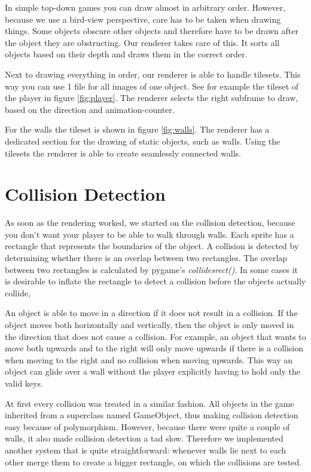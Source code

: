 \documentclass[a4paper,pdf,12pt]{article}
\begin{document}
In simple top-down games you can draw almost in arbitrary order. However, because we use a bird-view perspective, care has to be taken when drawing things. Some objects obscure other objects and therefore have to be drawn after the object they are obstructing. Our renderer takes care of this. It sorts all objects based on their depth and draws them in the correct order.

Next to drawing everything in order, our renderer is able to handle tilesets. This way you can use 1 file for all images of one object. See for example the tileset of the player in figure \ref{fig:player}. The renderer selects the right subframe to draw, based on the direction and animation-counter.

For the walls the tileset is shown in figure \ref{fig:walls}. The renderer has a dedicated section for the drawing of static objects, such as walls. Using the tilesets the renderer is able to create seamlessly connected walls.



\section{Collision Detection}
\label{sec:Collision Detection}
As soon as the rendering worked, we started on the collision detection, because you don't want your player to be able to walk through walls. Each sprite has a rectangle that represents the boundaries of the object. A collision is detected by determining whether there is an overlap between two rectangles. The overlap between two rectangles is calculated by pygame's \textit{collidesrect()}. In some cases it is desirable to inflate the rectangle to detect a collision before the objects actually collide,

An object is able to move in a direction if it does not result in a collision. If the object moves both horizontally and vertically, then the object is only moved in the direction that does not cause a collision. For example, an object that wants to move both upwards and to the right will only move upwards if there is a collision when moving to the right and no collision when moving upwards. This way an object can glide over a wall without the player explicitly having to hold only the valid keys. 

At first every collision was treated in a similar fashion. All objects in the game inherited from a superclass named GameObject, thus making collision detection easy because of polymorphism. However, because there were quite a couple of walls, it also made collision detection a tad slow. Therefore we implemented another system that is quite straightforward: whenever walls lie next to each other merge them to create a bigger rectangle, on which the collisions are tested.
\end{document}
